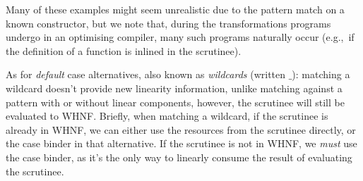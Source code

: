 \documentclass[acmsmall,review,anonymous,screen]{acmart}
\begin{document}
Many of these examples might seem unrealistic due to the pattern
match on a known constructor, but we note that, during the
transformations programs undergo in an optimising compiler, many
such programs naturally occur (e.g.,~if the definition of a
function is inlined in the scrutinee).
%



As for \emph{default} case alternatives, also known as \emph{wildcards}
(written $\_$): matching a wildcard doesn't provide new linearity information,
unlike matching against a pattern with or without linear components, however,
the scrutinee will still be evaluated to WHNF.
%
%
Briefly, when matching a wildcard, if the scrutinee is already in WHNF, we can
either use the resources from the scrutinee directly, or the case binder in
that alternative. If the scrutinee is not in WHNF, we \emph{must} use the case
binder, as it's the only way to linearly consume the result of evaluating the
scrutinee.
\end{document}
